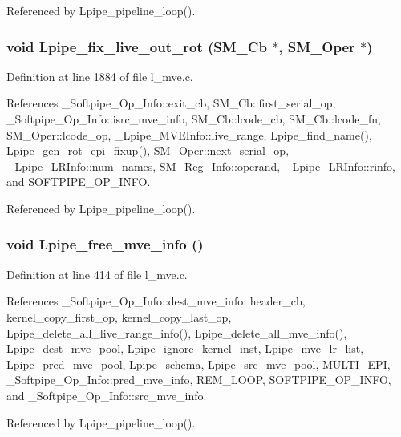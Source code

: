 Referenced by Lpipe\_\-pipeline\_\-loop().
\subsubsection{\setlength{\rightskip}{0pt plus 5cm}void Lpipe\_\-fix\_\-live\_\-out\_\-rot (\bf{SM\_\-Cb} $\ast$, \bf{SM\_\-Oper} $\ast$)}\label{l__mve_8h_c587875c384d37d616aeeb12c5a1de11}




Definition at line 1884 of file l\_\-mve.c.

References \_\-Softpipe\_\-Op\_\-Info::exit\_\-cb, SM\_\-Cb::first\_\-serial\_\-op, \_\-Softpipe\_\-Op\_\-Info::isrc\_\-mve\_\-info, SM\_\-Cb::lcode\_\-cb, SM\_\-Cb::lcode\_\-fn, SM\_\-Oper::lcode\_\-op, \_\-Lpipe\_\-MVEInfo::live\_\-range, Lpipe\_\-find\_\-name(), Lpipe\_\-gen\_\-rot\_\-epi\_\-fixup(), SM\_\-Oper::next\_\-serial\_\-op, \_\-Lpipe\_\-LRInfo::num\_\-names, SM\_\-Reg\_\-Info::operand, \_\-Lpipe\_\-LRInfo::rinfo, and SOFTPIPE\_\-OP\_\-INFO.

Referenced by Lpipe\_\-pipeline\_\-loop().
\subsubsection{\setlength{\rightskip}{0pt plus 5cm}void Lpipe\_\-free\_\-mve\_\-info ()}\label{l__mve_8h_78c3c1d55b2de2cc8d2c30fc73669d6b}




Definition at line 414 of file l\_\-mve.c.

References \_\-Softpipe\_\-Op\_\-Info::dest\_\-mve\_\-info, header\_\-cb, kernel\_\-copy\_\-first\_\-op, kernel\_\-copy\_\-last\_\-op, Lpipe\_\-delete\_\-all\_\-live\_\-range\_\-info(), Lpipe\_\-delete\_\-all\_\-mve\_\-info(), Lpipe\_\-dest\_\-mve\_\-pool, Lpipe\_\-ignore\_\-kernel\_\-inst, Lpipe\_\-mve\_\-lr\_\-list, Lpipe\_\-pred\_\-mve\_\-pool, Lpipe\_\-schema, Lpipe\_\-src\_\-mve\_\-pool, MULTI\_\-EPI, \_\-Softpipe\_\-Op\_\-Info::pred\_\-mve\_\-info, REM\_\-LOOP, SOFTPIPE\_\-OP\_\-INFO, and \_\-Softpipe\_\-Op\_\-Info::src\_\-mve\_\-info.

Referenced by Lpipe\_\-pipeline\_\-loop().

